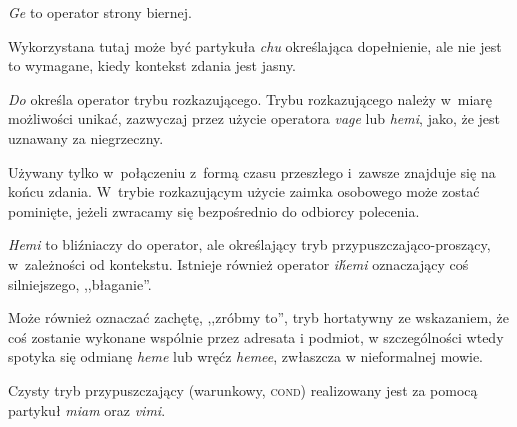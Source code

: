 \begin{spacing}{1.1}


\emph{Ge} to operator strony biernej.


Wykorzystana tutaj może być partykuła \emph{chu} określająca dopełnienie, ale
nie jest to wymagane, kiedy kontekst zdania jest jasny.


\skipline

\emph{Do} określa operator trybu rozkazującego. Trybu rozkazującego należy
w~miarę możliwości unikać, zazwyczaj przez użycie operatora \emph{vage} lub
\emph{hemi}, jako, że jest uznawany za niegrzeczny.

Używany tylko w~połączeniu z~formą czasu przeszłego i~zawsze znajduje się na
końcu zdania. W~trybie rozkazującym użycie zaimka osobowego może zostać
pominięte, jeżeli zwracamy się bezpośrednio do odbiorcy polecenia.



\emph{Hemi} to bliźniaczy do operator, ale określający tryb
przypuszczająco-proszący, w~zależności od kontekstu. Istnieje również operator
\emph{ih́emi} oznaczający coś silniejszego, ,,błaganie''.



Może również oznaczać zachętę, ,,zróbmy to'', tryb hortatywny ze wskazaniem, że
coś zostanie wykonane wspólnie przez adresata i podmiot, w szczególności wtedy
spotyka się odmianę \emph{heme} lub wręćz \emph{hemee}, zwłaszcza w nieformalnej
mowie.


Czysty tryb przypuszczający (warunkowy, \textsc{cond}) realizowany jest za
pomocą partykuł \emph{miam} oraz \emph{vimi}.



\end{spacing}
